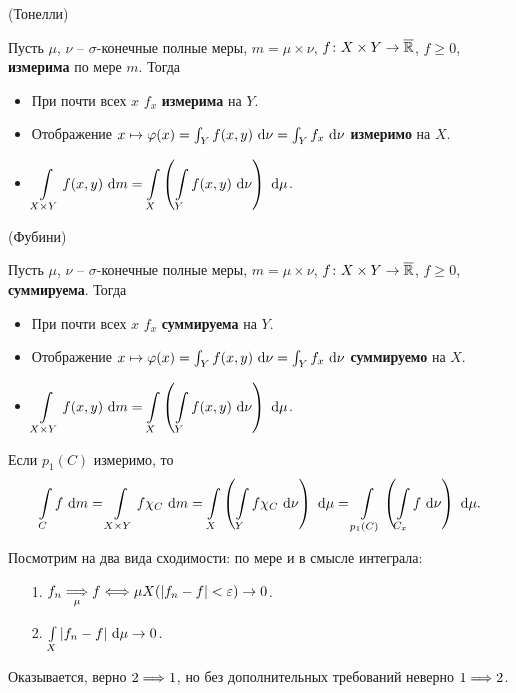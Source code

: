 \begin{theorem}(Тонелли)
    
    Пусть $\mu$, $\nu$ -- $\sigma$-конечные полные меры, $m = \mu \times \nu$,
    $f \colon X \times Y \to \overline{\mathbb{R}}$, $f \geqslant 0$, \textbf{измерима} по мере $m$.
    Тогда
    \begin{itemize}
        \item При почти всех $x$ $f_x$ \textbf{измерима} на $Y$.
        \item Отображение $x \mapsto \varphi(x) = \int_{Y}{f(x, y) ~\mathrm{d}\nu} 
        = \int_{Y}{f_x ~\mathrm{d}\nu}$ \textbf{измеримо} на $X$.
        \item $\displaystyle \int\limits_{X \times Y}{f(x, y) ~\mathrm{d} m} 
            = \int\limits_{X}{\left(\int\limits_{Y}{f(x, y) ~\mathrm{d}\nu}\right) ~\mathrm{d}\mu}$.
    \end{itemize} 
\end{theorem}

\begin{theorem}(Фубини)
    
    Пусть $\mu$, $\nu$ -- $\sigma$-конечные полные меры, $m = \mu \times \nu$,
    $f \colon X \times Y \to \overline{\mathbb{R}}$, $f \geqslant 0$, \textbf{суммируема}.
    Тогда
    \begin{itemize}
        \item При почти всех $x$ $f_x$ \textbf{суммируема} на $Y$.
        \item Отображение $x \mapsto \varphi(x) = \int_{Y}{f(x, y) ~\mathrm{d}\nu} 
            = \int_{Y}{f_x ~\mathrm{d}\nu}$ \textbf{суммируемо} на $X$.
        \item $\displaystyle \int\limits_{X \times Y}{f(x, y) ~\mathrm{d} m} 
            = \int\limits_{X}{\left(\int\limits_{Y}{f(x, y) ~\mathrm{d}\nu}\right) ~\mathrm{d}\mu}$.
    \end{itemize} 

\end{theorem}

\begin{corollary}
    Если $p_1(C)$ измеримо, то
\[
    \int\limits_{C}{f ~\mathrm{d} m} = \int\limits_{X \times Y}{f \chi_C ~\mathrm{d} m} 
    = \int\limits_{X}{\left(\int\limits_{Y}{f \chi_C ~\mathrm{d}\nu}\right) ~\mathrm{d}\mu}
    = \int\limits_{p_1(C)}{\left(\int\limits_{C_x}{f ~\mathrm{d}\nu}\right) ~\mathrm{d}\mu}
.\]
\end{corollary}

\begin{remark}
    Посмотрим на два вида сходимости: по мере и в смысле интеграла:
    \begin{itemize}
        \item[1.] $f_n \underset{\mu}{\Longrightarrow} f \Longleftrightarrow \mu X(|f_n - f| < \varepsilon) \to 0$.
        \item[2.] $\int\limits_{X}{|f_n - f| ~\mathrm{d}\mu} \to 0$.
    \end{itemize} 
    Оказывается, верно $2 \Longrightarrow 1$, но без дополнительных требований неверно $1 \Longrightarrow 2$.
\end{remark}


